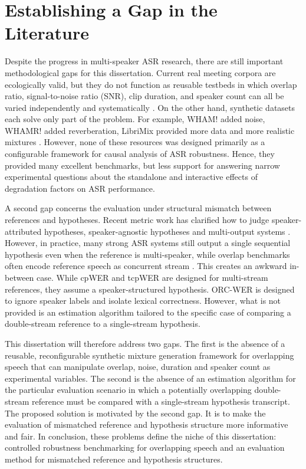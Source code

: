 \section{Establishing a Gap in the Literature}
Despite the progress in multi-speaker ASR research, there are still important methodological gaps for this dissertation. Current real meeting corpora are ecologically valid, but they do not function as reusable testbeds in which overlap ratio, signal-to-noise ratio (SNR), clip duration, and speaker count can all be varied independently and systematically \citep{ami-corpus,watanabe2020chime6challengetacklingmultispeakerspeech}. On the other hand, synthetic datasets each solve only part of the problem. For example, WHAM! added noise, WHAMR! added reverberation, LibriMix provided more data and more realistic mixtures \citep{wichern2019whamextendingspeechseparation, maciejewski2020whamrnoisyreverberantsinglechannel, cosentino2020librimixopensourcedatasetgeneralizable}. However, none of these resources was designed primarily as a configurable framework for causal analysis of ASR robustness. Hence, they provided many excellent benchmarks, but less support for answering narrow experimental questions about the standalone and interactive effects of degradation factors on ASR performance.

A second gap concerns the evaluation under structural mismatch between references and hypotheses. Recent metric work has clarified how to judge speaker-attributed hypotheses, speaker-agnostic hypotheses and multi-output systems \citep{von_Neumann_2023, vonneumann2024meetevaltoolkitcomputationword,von_Neumann_2025}. However, in practice, many strong ASR systems still output a single sequential hypothesis even when the reference is multi-speaker, while overlap benchmarks often encode reference speech as concurrent stream \citep{baevski2020wav2vec20frameworkselfsupervised,sekoyan2025canary1bv2parakeettdt06bv3efficient}. This creates an awkward in-between case. While cpWER and tcpWER are designed for multi-stream references, they assume a speaker-structured hypothesis. ORC-WER is designed to ignore speaker labels and isolate lexical correctness. However, what is not provided is an estimation algorithm tailored to the specific case of comparing a double-stream reference to a single-stream hypothesis.

This dissertation will therefore address two gaps. The first is the absence of a reusable, reconfigurable synthetic mixture generation framework for overlapping speech that can manipulate overlap, noise, duration and speaker count as experimental variables. The second is the absence of an estimation algorithm for the particular evaluation scenario in which a potentially overlapping double-stream reference must be compared with a single-stream hypothesis transcript. The proposed solution is motivated by the second gap. It is to make the evaluation of mismatched reference and hypothesis structure more informative and fair. In conclusion, these problems define the niche of this dissertation: controlled robustness benchmarking for overlapping speech and an evaluation method for mismatched reference and hypothesis structures.

